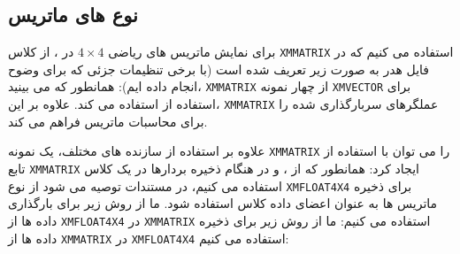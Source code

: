 \subsection{\textbf{نوع های ماتریس}}
\label{subsec:2.8.1}
{
    \Large
    \begin{spacing}{1.5}
        برای نمایش ماتریس های ریاضی $4\times 4$ در ، از کلاس \texttt{XMMATRIX} استفاده می کنیم که در فایل هدر  به صورت زیر تعریف شده است (با برخی تنظیمات جزئی که برای وضوح انجام داده ایم):
        \textbf{\vspace{6pt}}
        \lr{}
        \textbf{\vspace{6pt}}
        همانطور که می بینید، \texttt{XMMATRIX} از چهار نمونه \texttt{XMVECTOR} برای استفاده از  استفاده می کند. علاوه بر این، \texttt{XMMATRIX} عملگرهای سربارگذاری شده را برای محاسبات ماتریس فراهم می کند.

        علاوه بر استفاده از سازنده های مختلف، یک نمونه \texttt{XMMATRIX} را می توان با استفاده از تابع \texttt{XMMATRIX} ایجاد کرد:
        \textbf{\vspace{6pt}}
        \lr{}
        \textbf{\vspace{6pt}}
        همانطور که از ،  و  در هنگام ذخیره بردارها در یک کلاس استفاده می کنیم،
        در مستندات  توصیه می شود از نوع \texttt{XMFLOAT4X4} برای ذخیره ماتریس ها به عنوان اعضای داده کلاس استفاده شود.
        \textbf{\vspace{6pt}}
        \lr{}
        \textbf{\vspace{6pt}}
        ما از روش زیر برای بارگذاری داده ها از \texttt{XMFLOAT4X4} در \texttt{XMMATRIX} استفاده می کنیم:
        \textbf{\vspace{6pt}}
        \lr{}
        \textbf{\vspace{6pt}}
        ما از روش زیر برای ذخیره داده ها از \texttt{XMMATRIX} در \texttt{XMFLOAT4X4} استفاده می کنیم:
        \textbf{\vspace{6pt}}
        \lr{}
    \end{spacing}
}

